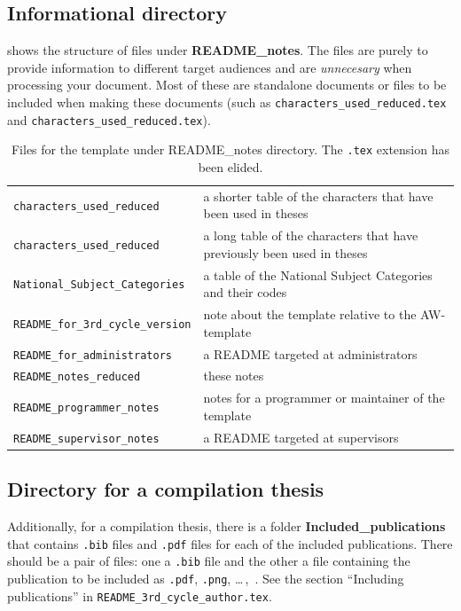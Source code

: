 \documentclass[12pt, twoside]{article}
\newcommand{\dname}[1]{\textbf{#1}}
\newcommand{\fname}[1]{\texttt{#1}}
\begin{document}
\subsection{Informational directory}

 shows the structure of files under \dname{README\_notes}. The files are purely to provide information to different target audiences and are \textit{unnecesary} when processing your document. Most of these are standalone documents or files to be included when making these documents (such as \fname{characters\_used\_reduced.tex} and
\fname{characters\_used\_reduced.tex}).

\begin{table}[!ht]
    \caption[Files for the template under README\_notes]{Files for the template under README\_notes directory. The \fname{.tex} extension has been elided.}
    \label{tab:file_structure_readme_notes}
    \begin{tabular}{L{7.5cm}<{\footnotesize} L{5.5cm}}
\hline
\fname{characters\_used\_reduced} & a shorter table of the characters that have been used in theses\\
\fname{characters\_used\_reduced} & a long table of the characters that have previously been used in theses\\
\fname{National\_Subject\_Categories} & a table of the National Subject Categories and their codes \\
\fname{README\_for\_3rd\_cycle\_version} & note about the template relative to the AW-template \\
\fname{README\_for\_administrators} & a README targeted at administrators \\
\fname{README\_notes\_reduced} & these notes \\
\fname{README\_programmer\_notes} & notes for a programmer or maintainer of the template\\
\fname{README\_supervisor\_notes} & a README targeted at supervisors \\
\end{tabular}
\end{table}

\subsection{Directory for a compilation thesis}
Additionally, for a compilation thesis, there is a folder \dname{Included\_publications} that contains \fname{.bib} files and \fname{.pdf} files for each of the included publications. There should be a pair of files: one a \fname{.bib} file and the other a file containing the publication to be included as \fname{.pdf}, \fname{.png}, \ldots\,,\ .
See the section ``Including publications'' in  \fname{README\_3rd\_cycle\_author.tex}.
\end{document}
